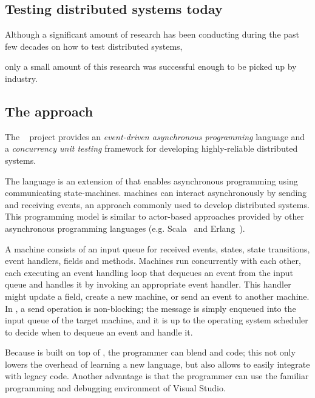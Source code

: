 
\subsection{Testing distributed systems today}
\label{sec:overview:testing}

Although a significant amount of research has been conducting during the past few decades on how to test distributed systems,

only a small amount of this research was successful enough to be picked up by industry.


\subsection{The \psharp approach}
\label{sec:overview:psharp}


The \psharp~\cite{deligiannis2015psharp} project provides an \emph{event-driven asynchronous programming} language and a \emph{concurrency unit testing} framework for developing highly-reliable distributed systems.

The \psharp language is an extension of \csharp that enables asynchronous programming using communicating state-machines. \psharp machines can interact asynchronously by sending and receiving events, an approach commonly used to develop distributed systems. This programming model is similar to actor-based approaches provided by other asynchronous programming languages (e.g. Scala~\cite{odersky2008programming} and Erlang~\cite{armstrong1996erlang}).

A \psharp machine consists of an input queue for received events, states, state transitions, event handlers, fields and methods. Machines run concurrently with each other, each executing an event handling loop that dequeues an event from the input queue and handles it by invoking an appropriate event handler. This handler might update a field, create a new machine, or send an event to another machine. In \psharp, a send operation is non-blocking; the message is simply enqueued into the input queue of the target machine, and it is up to the operating system scheduler to decide when to dequeue an event and handle it.

Because \psharp is built on top of \csharp, the programmer can blend \psharp and \csharp code; this not only lowers the overhead of learning a new language, but also allows \psharp to easily integrate with legacy code. Another advantage is that the programmer can use the familiar programming and debugging environment of Visual Studio.

